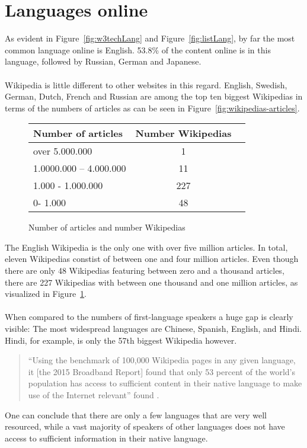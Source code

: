 \section{Languages online}

As evident in Figure~\ref{fig:w3techLang} and Figure~\ref{fig:listLang}, by far the most common language online is English. 53.8\% of the content online is in this language, followed by Russian, German and Japanese. \citep{w3techLang} \\
\\
Wikipedia is little different to other websites in this regard. English, Swedish, German, Dutch, French and Russian are among the top ten biggest Wikipedias in terms of the numbers of articles as can be seen in Figure~\ref{fig:wikipedias-articles}. \\
\begin{figure}[H]
\begin{center}
	\begin{tabular}{| l | c | r |}
		\hline			
		Number of articles & Number Wikipedias \\ \hline
		over 5.000.000 & 1 \\
		1.0000.000 -- 4.000.000 & 11 \\
		1.000 - 1.000.000 & 227 \\
		0- 1.000 & 48 \\
		\hline  
	\end{tabular}
	\end{center}
	\caption{Number of articles and number Wikipedias}
	\label{fig:tableNumWP}
\end{figure}
The English Wikipedia is the only one with over five million articles. In total, eleven Wikipedias constist of between one and four million articles. Even though there are only 48 Wikipedias featuring between zero and a thousand articles, there are 227 Wikipedias with between one thousand and one million articles, as visualized in Figure~\ref{fig:tableNumWP}. \citep{wiki:30} \\
\\
When compared to the numbers of first-language speakers a huge gap is clearly visible: The most widespread languages are Chinese, Spanish, English, and Hindi. Hindi, for example, is only the 57th biggest Wikipedia however.
\begin{quote}
``Using the benchmark of 100,000 Wikipedia pages in any given language, it [the 2015 Broadband Report] found that only 53 percent of the world’s population has access to sufficient content in their native language to make use of the Internet relevant'' found \citet{atlanticLang}.
\end{quote} 
One can conclude that there are only a few languages that are very well resourced, while a vast majority of speakers of other languages does not have access to sufficient information in their native language. 